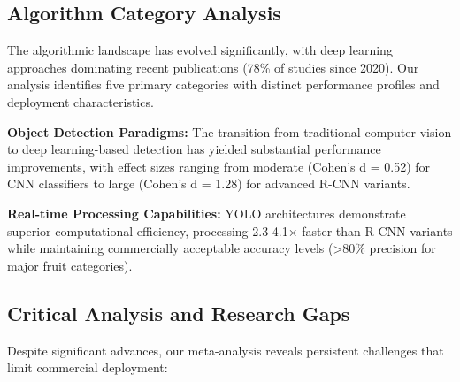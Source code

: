 \subsection{Algorithm Category Analysis}
\label{subsec:vision_algorithm_categories}


The algorithmic landscape has evolved significantly, with deep learning approaches dominating recent publications (78\% of studies since 2020). Our analysis identifies five primary categories with distinct performance profiles and deployment characteristics.

\textbf{Object Detection Paradigms:} The transition from traditional computer vision to deep learning-based detection has yielded substantial performance improvements, with effect sizes ranging from moderate (Cohen's d = 0.52) for CNN classifiers to large (Cohen's d = 1.28) for advanced R-CNN variants.

\textbf{Real-time Processing Capabilities:} YOLO architectures demonstrate superior computational efficiency, processing 2.3-4.1× faster than R-CNN variants while maintaining commercially acceptable accuracy levels (>80\% precision for major fruit categories).

\subsection{Critical Analysis and Research Gaps}
\label{subsec:vision_critical_analysis}


Despite significant advances, our meta-analysis reveals persistent challenges that limit commercial deployment:

